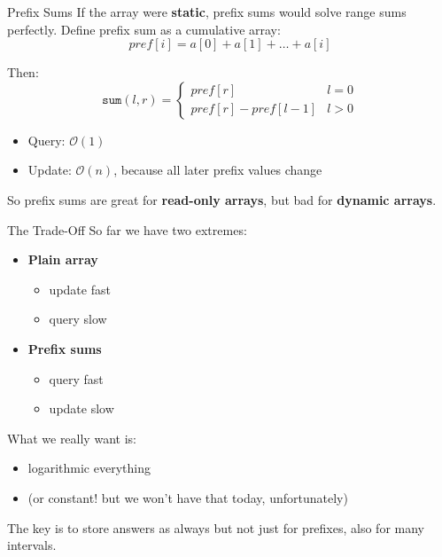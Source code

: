 \documentclass[aspectratio=169]{beamer}
\begin{document}
\begin{frame}{Prefix Sums}
    If the array were \textbf{static}, prefix sums would solve range sums perfectly. Define prefix sum as a cumulative array:
    $$
    pref[i] = a[0] + a[1] + \dots + a[i]
    $$

    Then:
    $$
    \texttt{sum}(l,r) =
    \begin{cases}
        pref[r] & l = 0 \\
        pref[r] - pref[l-1] & l > 0
    \end{cases}
    $$

    \begin{itemize}
        \item Query: \(\mathcal{O}(1)\)
        \item Update: \(\mathcal{O}(n)\), because all later prefix values change
    \end{itemize}

    So prefix sums are great for \textbf{read-only arrays}, but bad for
    \textbf{dynamic arrays}.
\end{frame}

\begin{frame}{The Trade-Off}
    So far we have two extremes:

    \begin{itemize}
        \item \textbf{Plain array}
        \begin{itemize}
            \item update fast
            \item query slow
        \end{itemize}
        \item \textbf{Prefix sums}
        \begin{itemize}
            \item query fast
            \item update slow
        \end{itemize}
    \end{itemize}

    What we really want is:
    \begin{itemize}
        \item logarithmic everything
        \item (or constant! but we won't have that today, unfortunately)
    \end{itemize}

    The key is to store answers as always but not just for prefixes, also for many intervals.
\end{frame}
\end{document}
